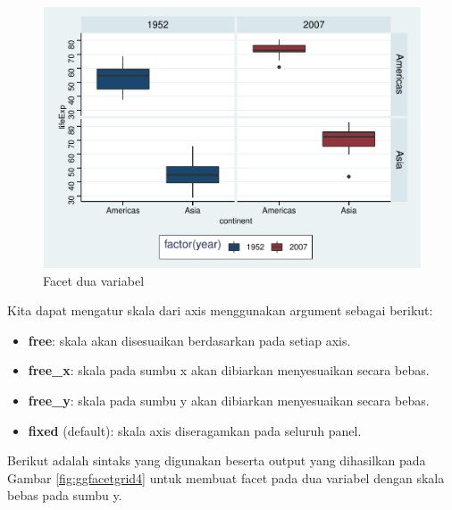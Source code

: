 \documentclass[]{book}
\newenvironment{Shaded}{\begin{snugshade}}{\end{snugshade}}
\newcommand{\KeywordTok}[1]{\textcolor[rgb]{0.13,0.29,0.53}{\textbf{#1}}}
\newcommand{\DataTypeTok}[1]{\textcolor[rgb]{0.13,0.29,0.53}{#1}}
\newcommand{\DecValTok}[1]{\textcolor[rgb]{0.00,0.00,0.81}{#1}}
\newcommand{\StringTok}[1]{\textcolor[rgb]{0.31,0.60,0.02}{#1}}
\newcommand{\OperatorTok}[1]{\textcolor[rgb]{0.81,0.36,0.00}{\textbf{#1}}}
\newcommand{\NormalTok}[1]{#1}
\providecommand{\tightlist}{%
  \setlength{\itemsep}{0pt}\setlength{\parskip}{0pt}}
\begin{document}
\begin{figure}

{\centering \includegraphics[width=0.8\linewidth]{EnvStat_files/figure-latex/ggfacetgrid3-1} 

}

\caption{Facet dua variabel}\label{fig:ggfacetgrid3}
\end{figure}

Kita dapat mengatur skala dari axis menggunakan argument sebagai
berikut:

\begin{itemize}
\tightlist
\item
  \textbf{free}: skala akan disesuaikan berdasarkan pada setiap axis.
\item
  \textbf{free\_x}: skala pada sumbu x akan dibiarkan menyesuaikan
  secara bebas.
\item
  \textbf{free\_y}: skala pada sumbu y akan dibiarkan menyesuaikan
  secara bebas.
\item
  \textbf{fixed} (default): skala axis diseragamkan pada seluruh panel.
\end{itemize}

Berikut adalah sintaks yang digunakan beserta output yang dihasilkan
pada Gambar \ref{fig:ggfacetgrid4} untuk membuat facet pada dua variabel
dengan skala bebas pada sumbu y.

\begin{Shaded}
\end{Shaded}
\end{document}
